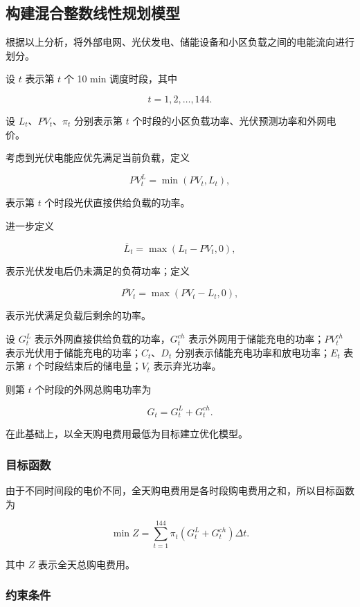 \subsection{构建混合整数线性规划模型}

根据以上分析，将外部电网、光伏发电、储能设备和小区负载之间的电能流向进行划分。

设 \(t\) 表示第 \(t\) 个 10 min 调度时段，其中

\[
t=1,2,\ldots,144.
\]

设 \(L_t\)、\(PV_t\)、\(\pi_t\) 分别表示第 \(t\) 个时段的小区负载功率、光伏预测功率和外网电价。

考虑到光伏电能应优先满足当前负载，定义

\[
PV_t^{L}=\min(PV_t,L_t),
\]

表示第 \(t\) 个时段光伏直接供给负载的功率。

进一步定义

\[
\overline L_t=\max(L_t-PV_t,0),
\]

表示光伏发电后仍未满足的负荷功率；定义

\[
\overline{PV}_t=\max(PV_t-L_t,0),
\]

表示光伏满足负载后剩余的功率。

设 \(G_t^L\) 表示外网直接供给负载的功率，\(G_t^{ch}\) 表示外网用于储能充电的功率；\(PV_t^{ch}\) 表示光伏用于储能充电的功率；\(C_t\)、\(D_t\) 分别表示储能充电功率和放电功率；\(E_t\) 表示第 \(t\) 个时段结束后的储电量；\(V_t\) 表示弃光功率。

则第 \(t\) 个时段的外网总购电功率为

\[
G_t=G_t^L+G_t^{ch}.
\]

在此基础上，以全天购电费用最低为目标建立优化模型。

\subsubsection{目标函数}

由于不同时间段的电价不同，全天购电费用是各时段购电费用之和，所以目标函数为

\begin{equation}
\min Z=
\sum_{t=1}^{144}
\pi_t
\left(G_t^L+G_t^{ch}\right)\Delta t.
\end{equation}

其中 \(Z\) 表示全天总购电费用。

\subsubsection{约束条件}

